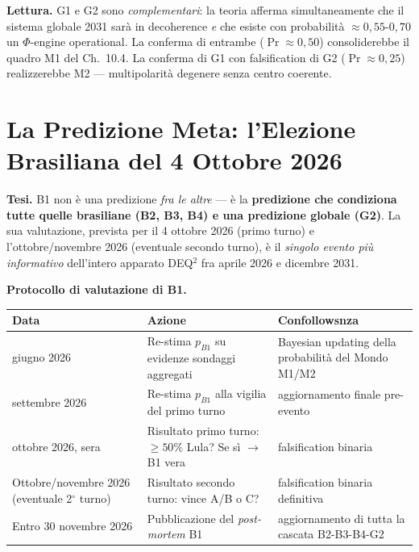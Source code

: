 \Hypoth{} \textbf{Lettura.} G1 e G2 sono \emph{complementari}: la teoria
afferma simultaneamente che il sistema globale 2031 sarà in decoherence
\emph{e} che esiste con probabilità \(\approx 0{,}55\)-\(0{,}70\) un
\(\Phi\)-engine operational. La conferma di entrambe
(\(\Pr \approx 0{,}50\)) consoliderebbe il quadro M1 del Ch.~10.4. La
conferma di G1 con falsification di G2 (\(\Pr \approx 0{,}25\))
realizzerebbe M2 --- multipolarità degenere senza centro coerente.



\section{La Predizione Meta: l'Elezione Brasiliana del 4 Ottobre
2026}\label{la-predizione-meta-lelezione-Brazilian-del-4-ottobre-2026}

\Hypoth{} \textbf{Tesi.} B1 non è una predizione \emph{fra le altre} ---
è la \textbf{predizione che condiziona tutte quelle brasiliane (B2, B3,
B4) e una predizione globale (G2)}. La sua valutazione, prevista per il
4 ottobre 2026 (primo turno) e l'ottobre/novembre 2026 (eventuale
secondo turno), è il \emph{singolo evento più informativo} dell'intero
apparato DEQ$^2$ fra aprile 2026 e dicembre 2031.

\Proved{} \textbf{Protocollo di valutazione di B1.}

{\def\LTcaptype{none} %
{\small\begin{longtable}[]{@{}
  >{\raggedright\arraybackslash}p{}
  >{\raggedright\arraybackslash}p{}
  >{\raggedright\arraybackslash}p{}@{}}
\toprule\noalign{}
\begin{minipage}[b]{\linewidth}\raggedright
Data
\end{minipage} & \begin{minipage}[b]{\linewidth}\raggedright
Azione
\end{minipage} & \begin{minipage}[b]{\linewidth}\raggedright
Confollowsnza
\end{minipage} \\
\midrule\noalign{}
\endhead
\bottomrule\noalign{}
\endlastfoot
30 giugno 2026 & Re-stima \(p_{B1}\) su evidenze sondaggi aggregati &
Bayesian updating della probabilità del Mondo M1/M2 \\
30 settembre 2026 & Re-stima \(p_{B1}\) alla vigilia del primo turno &
aggiornamento finale pre-evento \\
4 ottobre 2026, sera & Risultato primo turno: \(\geq 50\%\) Lula? Se sì
$\to$ B1 vera & falsification binaria \\
Ottobre/novembre 2026 (eventuale 2$^\circ$ turno) & Risultato secondo turno:
vince A/B o C? & falsification binaria definitiva \\
Entro 30 novembre 2026 & Pubblicazione del \emph{post-mortem} B1 &
aggiornamento di tutta la cascata B2-B3-B4-G2 \\
\end{longtable}}
}

